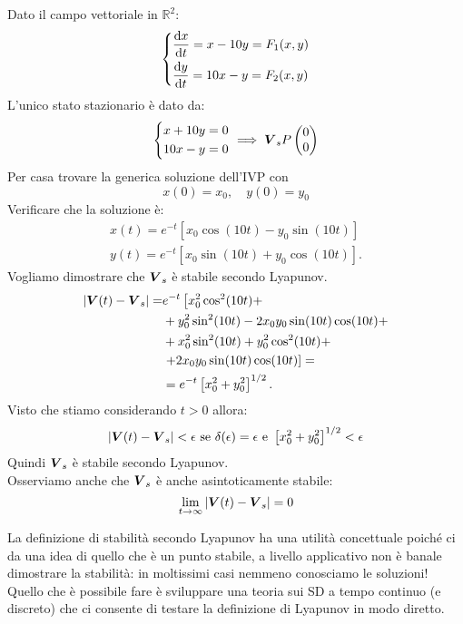 \begin{exmp}[3]
    Dato il campo vettoriale in $\mathbb{R}^2$:
    \[\begin{dcases}
	\frac{\text{d} x}{\text{d} t} = x-10y = F_1(x,y)\\
	\frac{\text{d} y}{\text{d} t} = 10x-y = F_2(x, y)
    \end{dcases}\] 
    L'unico stato stazionario è dato da:
    \[\begin{dcases}
        x + 10 y = 0\\
	10 x - y = 0
    \end{dcases}
    \implies  \boldsymbol{V}_s P \begin{pmatrix} 0 \\ 0 \end{pmatrix} 
\]  
Per casa trovare la generica soluzione dell'IVP con 
\[
    x(0)= x_0, \quad y(0)=y_0
\] Verificare che la soluzione è:
\[\begin{aligned}
    x(t)=e^{-t}\left[x_0\cos (10t)-y_0\sin (10t)\right]\\
    y(t)=e^{-t}\left[x_0\sin (10t)+y_0\cos (10t)\right]
.\end{aligned}\]
Vogliamo dimostrare che $\boldsymbol{V}_s$ è stabile secondo Lyapunov.
\[\begin{aligned}
    \left|\boldsymbol{V} (t)-\boldsymbol{V}_s\right| =& e^{-t}\left[x_0^2\cos^2(10t)+ \right.\\ 
					  &+ y_0^2\sin^2(10t)-2x_0y_0\sin (10t)\cos (10t) + \\
					  &+ x_0^2\sin^2(10t)+ y_0^2\cos^2(10t)+\\ 
					  &\left.+ 2x_0y_0\sin (10t)\cos (10t)\right] = \\
					  &= e^{-t}\left[x_0^2+ y_0^2\right]^{1 /2}
.\end{aligned}\]
Visto che stiamo considerando $t>0$ allora:
\[
    \left|\boldsymbol{V} (t)-\boldsymbol{V}_s\right| <\epsilon  \text{ se } \delta (\epsilon)=\epsilon  \text{ e } \left[x_0^2+y_0^2\right]^{1 /2}<\epsilon
\] 
Quindi $\boldsymbol{V}_s$ è stabile secondo Lyapunov.\\
Osserviamo anche che $\boldsymbol{V}_s$ è anche asintoticamente stabile:
\[
    \lim_{t \to \infty} \left|\boldsymbol{V} (t)-\boldsymbol{V}_s\right|=0
\] 
\end{exmp}
\noindent
La definizione di stabilità secondo Lyapunov ha una utilità concettuale poiché ci da una idea di quello che è un punto stabile, a livello applicativo non è banale dimostrare la stabilità: in moltissimi casi nemmeno conosciamo le soluzioni!\\
Quello che è possibile fare è sviluppare una teoria sui SD a tempo continuo (e discreto) che ci consente di testare la definizione di Lyapunov in modo diretto.
